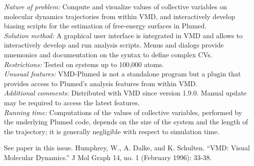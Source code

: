 \documentclass[preprint,review,11pt]{elsarticle}
\begin{document}
\begin{small}
  {\em Nature of problem:} Compute and visualize values of collective
  variables on molecular dynamics trajectories from within VMD, and
  interactively develop biasing scripts for the estimation of
  free-energy surfaces in Plumed.
  \\
  {\em Solution method:} A graphical user interface is integrated in
  VMD and allows to interactively develop and run analysis scripts.
  Menus and dialogs provide mnemonics and documentation on the syntax
  to define complex CVs.
  \\
  {\em Restrictions:}
  Tested on systems up to 100,000 atoms. \\
  {\em Unusual features:} VMD-Plumed is not a standalone program but a
  plugin that provides access to Plumed's analysis features from within VMD. \\
  {\em Additional comments:} Distributed with VMD since version 1.9.0.
  Manual  update may be required  to access the latest features.   \\
  {\em Running time:} Computations of the values of collective
  variables, performed by the underlying Plumed code, depends on the
  size of the system and the length  of the trajectory; it is 
  generally negligible with respect to simulation time.  \\
\begin{thebibliography}{0}
See paper in this issue.
Humphrey, W., A. Dalke, and K. Schulten. ``VMD: Visual
  Molecular Dynamics.'' J Mol Graph 14, no. 1 (February 1996): 33-38.
\end{thebibliography}

\end{small}


\end{document}
